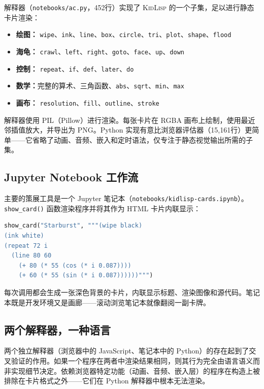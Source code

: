 \documentclass[10pt,letterpaper,twocolumn]{article}
\newcommand{\kidlisp}{\textsc{KidLisp}}
\begin{document}
解释器（\texttt{notebooks/ac.py}，452行）实现了 \kidlisp{} 的一个子集，足以进行静态卡片渲染：

\begin{itemize}
  \item \textbf{绘图：} \texttt{wipe}、\texttt{ink}、\texttt{line}、\texttt{box}、\texttt{circle}、\texttt{tri}、\texttt{plot}、\texttt{shape}、\texttt{flood}
  \item \textbf{海龟：} \texttt{crawl}、\texttt{left}、\texttt{right}、\texttt{goto}、\texttt{face}、\texttt{up}、\texttt{down}
  \item \textbf{控制：} \texttt{repeat}、\texttt{if}、\texttt{def}、\texttt{later}、\texttt{do}
  \item \textbf{数学：}完整的算术、三角函数、\texttt{abs}、\texttt{sqrt}、\texttt{min}、\texttt{max}
  \item \textbf{画布：} \texttt{resolution}、\texttt{fill}、\texttt{outline}、\texttt{stroke}
\end{itemize}

解释器使用 PIL（Pillow）进行渲染。每张卡片在 RGBA 画布上绘制，使用最近邻插值放大，并导出为 PNG。Python 实现有意比浏览器评估器（15,161行）更简单------它省略了动画、音频、嵌入和定时语法，仅专注于静态视觉输出所需的子集。

\subsection{Jupyter Notebook 工作流}

主要的策展工具是一个 Jupyter 笔记本（\texttt{notebooks/kidlisp-cards.ipynb}）。\texttt{show\_card()} 函数渲染程序并将其作为 HTML 卡片内联显示：

\begin{lstlisting}[language=python,basicstyle=\ttfamily\footnotesize]
show_card("Starburst", """(wipe black)
(ink white)
(repeat 72 i
  (line 80 60
    (+ 80 (* 55 (cos (* i 0.087))))
    (+ 60 (* 55 (sin (* i 0.087))))))""")
\end{lstlisting}

每次调用都会生成一张深色背景的卡片，内联显示标题、渲染图像和源代码。笔记本既是开发环境又是画廊------滚动浏览笔记本就像翻阅一副卡牌。

\subsection{两个解释器，一种语言}

两个独立解释器（浏览器中的 JavaScript、笔记本中的 Python）的存在起到了交叉验证的作用。如果一个程序在两者中渲染结果相同，则其行为完全由语言语义而非实现细节决定。依赖浏览器特定功能（动画、音频、嵌入层）的程序在构造上被排除在卡片格式之外------它们在 Python 解释器中根本无法渲染。
\end{document}
